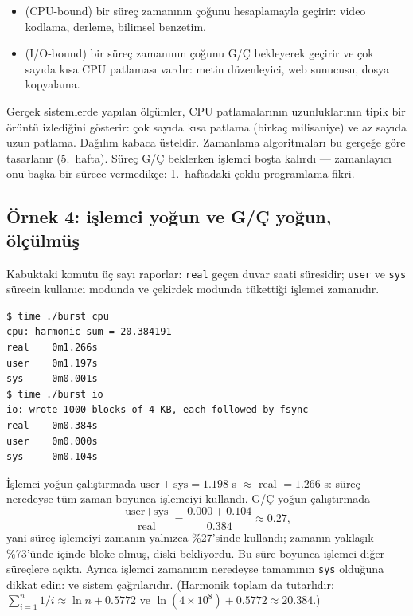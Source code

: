 \begin{itemize}
  \item {} (CPU-bound) bir süreç zamanının çoğunu hesaplamayla geçirir: video kodlama, derleme, bilimsel benzetim.
  \item {} (I/O-bound) bir süreç zamanının çoğunu G/Ç bekleyerek geçirir ve çok sayıda kısa CPU patlaması vardır: metin düzenleyici, web sunucusu, dosya kopyalama.
\end{itemize}

Gerçek sistemlerde yapılan ölçümler, CPU patlamalarının uzunluklarının tipik bir örüntü izlediğini gösterir: çok sayıda kısa patlama (birkaç milisaniye) ve az sayıda uzun patlama. Dağılım kabaca üsteldir. Zamanlama algoritmaları bu gerçeğe göre tasarlanır (5.~hafta). Süreç G/Ç beklerken işlemci boşta kalırdı --- zamanlayıcı onu başka bir sürece vermedikçe: 1.~haftadaki çoklu programlama fikri.

\subsection{Örnek 4: işlemci yoğun ve G/Ç yoğun, ölçülmüş}



Kabuktaki  komutu üç sayı raporlar: \texttt{real} geçen duvar saati süresidir; \texttt{user} ve \texttt{sys} sürecin kullanıcı modunda ve çekirdek modunda tükettiği işlemci zamanıdır.

\begin{lstlisting}[style=term]
$ time ./burst cpu
cpu: harmonic sum = 20.384191
real    0m1.266s
user    0m1.197s
sys     0m0.001s
$ time ./burst io
io: wrote 1000 blocks of 4 KB, each followed by fsync
real    0m0.384s
user    0m0.000s
sys     0m0.104s
\end{lstlisting}

\begin{example}
İşlemci yoğun çalıştırmada $\text{user}+\text{sys} = 1.198$ s $\approx$ real $= 1.266$ s: süreç neredeyse tüm zaman boyunca işlemciyi kullandı. G/Ç yoğun çalıştırmada
\[
\frac{\text{user} + \text{sys}}{\text{real}} = \frac{0.000 + 0.104}{0.384} \approx 0.27,
\]
yani süreç işlemciyi zamanın yalnızca \%27'sinde kullandı; zamanın yaklaşık \%73'ünde  içinde bloke olmuş, diski bekliyordu. Bu süre boyunca işlemci diğer süreçlere açıktı. Ayrıca işlemci zamanının neredeyse tamamının \texttt{sys} olduğuna dikkat edin:  ve  sistem çağrılarıdır. (Harmonik toplam da tutarlıdır: $\sum_{i=1}^{n} 1/i \approx \ln n + 0.5772$ ve $\ln(4\times10^{8}) + 0.5772 \approx 20.384$.)
\end{example}

